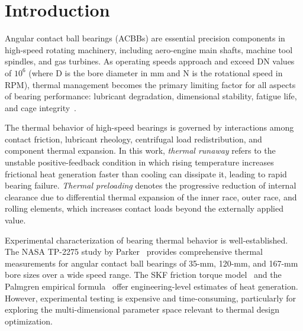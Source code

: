 \documentclass[applsci,article,submit,pdftex,moreauthors]{Definitions/mdpi}
\begin{document}
\section{Introduction}
\label{sec:intro}

Angular contact ball bearings (ACBBs) are essential precision components in high-speed rotating machinery, including aero-engine main shafts, machine tool spindles, and gas turbines. As operating speeds approach and exceed DN values of $10^6$ (where D is the bore diameter in mm and N is the rotational speed in RPM), thermal management becomes the primary limiting factor for all aspects of bearing performance: lubricant degradation, dimensional stability, fatigue life, and cage integrity~\cite{Harris2006,Takabi2013}.

The thermal behavior of high-speed bearings is governed by interactions among contact friction, lubricant rheology, centrifugal load redistribution, and component thermal expansion. In this work, \emph{thermal runaway} refers to the unstable positive-feedback condition in which rising temperature increases frictional heat generation faster than cooling can dissipate it, leading to rapid bearing failure. \emph{Thermal preloading} denotes the progressive reduction of internal clearance due to differential thermal expansion of the inner race, outer race, and rolling elements, which increases contact loads beyond the externally applied value.

Experimental characterization of bearing thermal behavior is well-established. The NASA TP-2275 study by Parker~\cite{Parker1984} provides comprehensive thermal measurements for angular contact ball bearings of 35-mm, 120-mm, and 167-mm bore sizes over a wide speed range. The SKF friction torque model~\cite{SKF2018} and the Palmgren empirical formula~\cite{Palmgren1959} offer engineering-level estimates of heat generation. However, experimental testing is expensive and time-consuming, particularly for exploring the multi-dimensional parameter space relevant to thermal design optimization.
\end{document}
